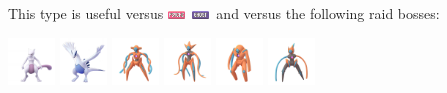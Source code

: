 \documentclass[12pt]{beamer}
\newcommand{\ghostfull}{\includegraphics[height=0.2cm]{../../images/type/full/Ghost.png}}
\newcommand{\psychicfull}{\includegraphics[height=0.2cm]{../../images/type/full/Psychic.png}}
\begin{document}
\begin{frame}
\begin{footnotesize}
\bigskip

\begin{block}{}\begin{center}
This type is useful versus \psychicfull~\ghostfull~and versus the following raid bosses:

    \includegraphics[width=1.25cm]{../../images/pokemon/mewtwo.png}
    \includegraphics[width=1.25cm]{../../images/pokemon/lugia.png}
    \includegraphics[width=1.25cm]{../../images/pokemon/deoxys_n.png}
    \includegraphics[width=1.25cm]{../../images/pokemon/deoxys_a.png}
    \includegraphics[width=1.25cm]{../../images/pokemon/deoxys_d.png}
    \includegraphics[width=1.25cm]{../../images/pokemon/deoxys_s.png}
    

\end{center}
\end{block}
\end{footnotesize}
\end{frame}
\end{document}
